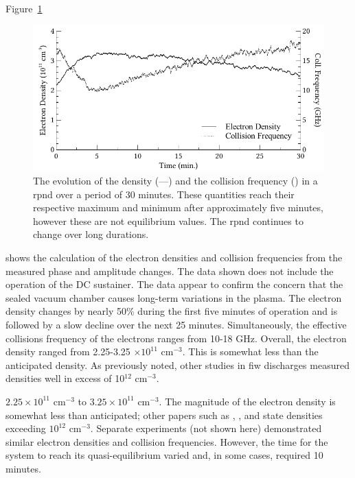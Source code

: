 Figure~\ref{fig:densev}
\begin{figure}
  \centering
  \includegraphics{./chapters/nasa/figures/densev.pdf}
  \caption{The evolution of the density (---) and the collision frequency
    (\raisebox{2.5pt}{${\scriptscriptstyle \centerdot \centerdot \centerdot}$}) in
    a \acs{rpnd} over a period of 30 minutes. These quantities reach their
    respective maximum and minimum after approximately five minutes, however these
    are not equilibrium values. The \acs{rpnd} continues to change over long
    durations.}
  \label{fig:densev}
\end{figure}
shows the calculation of the electron densities and collision frequencies from
the measured phase and amplitude changes. The data shown does not include the
operation of the DC sustainer. The data appear to confirm the concern that the
sealed vacuum chamber causes long-term variations in the plasma. The electron
density changes by nearly 50\% during the first five minutes of operation and is
followed by a slow decline over the next 25 minutes. Simultaneously, the
effective collisions frequency of the electrons ranges from 10-18 GHz. Overall,
the electron density ranged from 2.25-3.25 $\times10^{11}$ cm$^{-3}$. This is
somewhat less than the anticipated density. As previously noted, other studies
in \acs{fiw} discharges \cite{Aleksandrov2007, Pancheshnyi199, Macheret2006}
measured densities well in excess of 10$^{12}$ cm$^{-3}$.



$2.25\times 10^{11}$ cm$^{-3}$ to $3.25\times 10^{11}$ cm$^{-3}$. The magnitude
of the electron density is somewhat less than anticipated; other papers such as
\cite{Aleksandrov2007}, \cite{Pancheshnyi1999}, and \cite{Macheret2006} state
densities exceeding $10^{12}$ cm$^{-3}$. Separate experiments (not shown here)
demonstrated similar electron densities and collision frequencies. However, the
time for the system to reach its quasi-equilibrium varied and, in some cases,
required 10 minutes.

